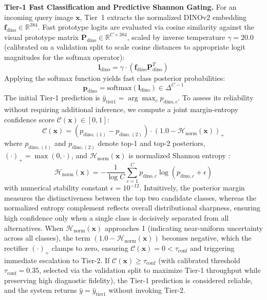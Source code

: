 \documentclass[conference]{IEEEtran}
\begin{document}
\textbf{Tier-1 Fast Classification and Predictive Shannon Gating.} For an incoming query image $\mathbf{x}$, Tier~1 extracts the normalized DINOv2 embedding $\mathbf{f}_{\text{dino}} \in \mathbb{R}^{384}$. Fast prototype logits are evaluated via cosine similarity against the visual prototype matrix $\mathbf{P}_{\text{dino}} \in \mathbb{R}^{C \times 384}$, scaled by inverse temperature $\gamma = 20.0$ (calibrated on a validation split to scale cosine distances to appropriate logit magnitudes for the softmax operator):
\begin{equation}
    \label{eq:tier1_logits}
    \mathbf{l}_{\text{dino}} = \gamma \cdot \left(\mathbf{f}_{\text{dino}} \mathbf{P}_{\text{dino}}^T\right)
\end{equation}
Applying the softmax function yields fast class posterior probabilities:
\begin{equation}
    \label{eq:tier1_softmax}
    \mathbf{p}_{\text{dino}} = \text{softmax}(\mathbf{l}_{\text{dino}}) \in \Delta^{C-1}
\end{equation}
The initial Tier-1 prediction is $\hat{y}_{\text{tier1}} = \arg\max_c p_{\text{dino}, c}$. To assess its reliability without requiring additional inference, we compute a joint margin-entropy confidence score $\mathcal{C}(\mathbf{x}) \in [0, 1]$:
\begin{equation}
    \label{eq:shannon_gate}
    \mathcal{C}(\mathbf{x}) = \left(p_{\text{dino}, (1)} - p_{\text{dino}, (2)}\right) \cdot \left(1.0 - \mathcal{H}_{\text{norm}}(\mathbf{x})\right)_+
\end{equation}
where $p_{\text{dino}, (1)}$ and $p_{\text{dino}, (2)}$ denote top-1 and top-2 posteriors, $(\cdot)_+ = \max(0, \cdot)$, and $\mathcal{H}_{\text{norm}}(\mathbf{x})$ is normalized Shannon entropy \cite{shannon1948mathematical}:
\begin{equation}
    \mathcal{H}_{\text{norm}}(\mathbf{x}) = -\frac{1}{\log C} \sum_{c=1}^C p_{\text{dino}, c} \log(p_{\text{dino}, c} + \epsilon)
\end{equation}
with numerical stability constant $\epsilon = 10^{-12}$. Intuitively, the posterior margin measures the distinctiveness between the top two candidate classes, whereas the normalized entropy complement reflects overall distributional sharpness, ensuring high confidence only when a single class is decisively separated from all alternatives. When $\mathcal{H}_{\text{norm}}(\mathbf{x})$ approaches 1 (indicating near-uniform uncertainty across all classes), the term $(1.0 - \mathcal{H}_{\text{norm}}(\mathbf{x}))$ becomes negative, which the rectifier $(\cdot)_+$ clamps to zero, ensuring $\mathcal{C}(\mathbf{x}) = 0 < \tau_{\text{conf}}$ and triggering immediate escalation to Tier-2. If $\mathcal{C}(\mathbf{x}) \ge \tau_{\text{conf}}$ (with calibrated threshold $\tau_{\text{conf}} = 0.35$, selected via the validation split to maximize Tier-1 throughput while preserving high diagnostic fidelity), the Tier-1 prediction is considered reliable, and the system returns $\hat{y} = \hat{y}_{\text{tier1}}$ without invoking Tier-2.
\end{document}
